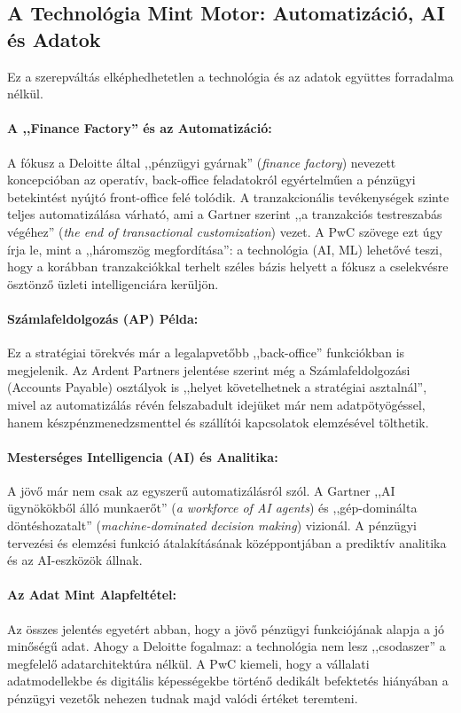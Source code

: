 \subsection{A Technológia Mint Motor: Automatizáció, AI és Adatok}
\label{ssec:technologia_motor}

Ez a szerepváltás elképhedhetetlen a technológia és az adatok együttes forradalma nélkül.
\paragraph{A ,,Finance Factory'' és az Automatizáció:} A fókusz a Deloitte által ,,pénzügyi gyárnak'' (\textit{finance factory}) nevezett koncepcióban az operatív, back-office feladatokról egyértelműen a pénzügyi betekintést nyújtó front-office felé tolódik\cite{Deloitte-Finance-2025}.
A tranzakcionális tevékenységek szinte teljes automatizálása várható, ami a Gartner szerint ,,a tranzakciós testreszabás végéhez'' (\textit{the end of transactional customization}) vezet\cite{Gartner-Finance-2030}.
A PwC szövege ezt úgy írja le, mint a ,,háromszög megfordítása'': a technológia (AI, ML) lehetővé teszi, hogy a korábban tranzakciókkal terhelt széles bázis helyett a fókusz a cselekvésre ösztönző üzleti intelligenciára kerüljön\cite{PwC-Future-of-Finance}.
\paragraph{Számlafeldolgozás (AP) Példa:} Ez a stratégiai törekvés már a legalapvetőbb ,,back-office'' funkciókban is megjelenik.
Az Ardent Partners jelentése szerint még a Számlafeldolgozási (Accounts Payable) osztályok is ,,helyet követelhetnek a stratégiai asztalnál'', mivel az automatizálás révén felszabadult idejüket már nem adatpötyögéssel, hanem készpénzmenedzsmenttel és szállítói kapcsolatok elemzésével tölthetik\cite{Ardent-ePayables-Report}.
\paragraph{Mesterséges Intelligencia (AI) és Analitika:} A jövő már nem csak az egyszerű automatizálásról szól.
A Gartner ,,AI ügynökökből álló munkaerőt'' (\textit{a workforce of AI agents}) és ,,gép-dominálta döntéshozatalt'' (\textit{machine-dominated decision making}) vizionál\cite{Gartner-Finance-2030}.
A pénzügyi tervezési és elemzési funkció átalakításának középpontjában a prediktív analitika és az AI-eszközök állnak.
\paragraph{Az Adat Mint Alapfeltétel:} Az összes jelentés egyetért abban, hogy a jövő pénzügyi funkciójának alapja a jó minőségű adat.
Ahogy a Deloitte fogalmaz: a technológia nem lesz ,,csodaszer'' a megfelelő adatarchitektúra nélkül\cite{Deloitte-Finance-2025}.
A PwC kiemeli, hogy a vállalati adatmodellekbe és digitális képességekbe történő dedikált befektetés hiányában a pénzügyi vezetők nehezen tudnak majd valódi értéket teremteni\cite{PwC-Future-of-Finance}.


